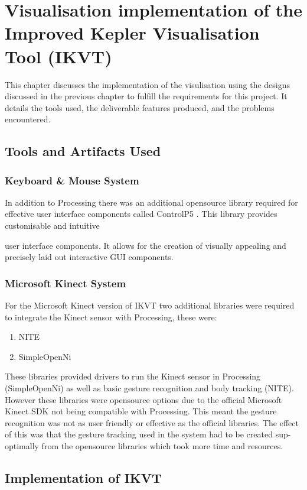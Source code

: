 \chapter{Visualisation implementation of the Improved Kepler Visualisation Tool
(IKVT)}\label{C:sd}
This chapter discusses the implementation of the visulisation using the designs
discussed in the previous chapter to fulfill the requirements for this project.
It details the tools used, the deliverable features
produced, and the problems encountered. 

\section{Tools and Artifacts Used}
\subsection{Keyboard \& Mouse System}
In addition to Processing there was an additional opensource
library required for effective user interface components called ControlP5
\cite{controlp5}. This library provides customisable and intuitive

user interface components. It allows for the creation of visually appealing and
precisely
laid out interactive GUI components.

\subsection{Microsoft Kinect System}
For the Microsoft Kinect version of IKVT two additional libraries were required
to integrate the Kinect sensor
with Processing, these were:
\begin{enumerate}
 \item NITE \cite{nite}
 \item SimpleOpenNi \cite{simpleopenni}
\end{enumerate}
These libraries provided drivers to run the Kinect sensor in Processing
(SimpleOpenNi) as well
as basic gesture recognition and body tracking (NITE). However these libraries
were
opensource options due to the official Microsoft Kinect SDK not being compatible
with
Processing. This meant the gesture recognition was not as user friendly or
effective as the
official libraries. The effect of this was that the gesture tracking used in the
system had to be created sup-optimally from the opensource libraries which took
more time and resources. 

\section{Implementation of IKVT}

